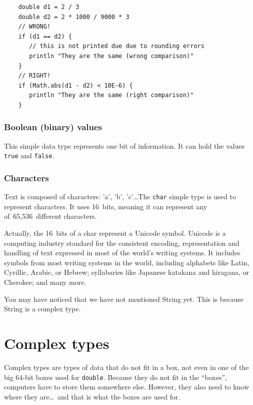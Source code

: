 \begin{verbatim}
    double d1 = 2 / 3
    double d2 = 2 * 1000 / 9000 * 3
    // WRONG!
    if (d1 == d2) {
       // this is not printed due due to rounding errors
       println "They are the same (wrong comparison)" 
    } 
    // RIGHT!
    if (Math.abs(d1 - d2) < 10E-6) {
       println "They are the same (right comparison)"
    } 
\end{verbatim}



\subsubsection{Boolean (binary) values}
\label{sec:bool-binary-valu}

This simple data type represents one bit of information. It can hold
the values \verb+true+ and \verb+false+. 

\subsubsection{Characters}
\label{sec:characters}

Text is composed of characters: 'a', 'b', 'c'\ldots The \verb+char+
simple type is
used to represent characters. It uses 16~bits, meaning it can
represent any of~65,536~different characters. 

Actually, the 16~bits of a char represent a Unicode symbol. Unicode is
a computing industry standard for the consistent encoding,
representation and handling of text expressed in most of the world's
writing systems. It includes symbols from most writing systems in
the world, including alphabets like Latin, Cyrillic, Arabic, or
Hebrew; syllabaries like Japanese katakana and hiragana, or
Cherokee; and many more. 

You may have noticed that we have not mentioned String yet. This is
because String is a complex type. 

\section{Complex types}
\label{sec:complex-types}

Complex types are types of data that do not fit in a box, not even in
one of the big 64-bit boxes used for \verb+double+. Because they do
not fit in the ``boxes'', computers have to store them somewhere
else. However, they also need to know where they are\ldots~and that is
what the boxes are used for. 

